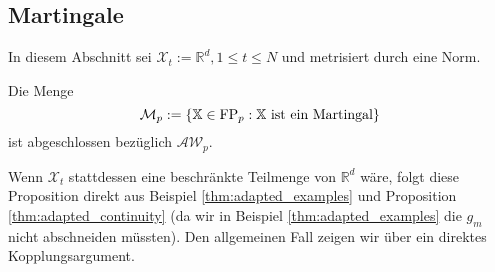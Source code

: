 \subsection{Martingale}
In diesem Abschnitt sei $\mathcal{X}_t := \mathbb{R}^d, 1\leq t \leq N$ und metrisiert durch eine Norm.
\begin{proposition}
    Die Menge 
    $$\mathcal{M}_p := \{\mathbb{X} \in \operatorname{FP}_p: \mathbb{X} \text{ ist ein Martingal} \}$$
    ist abgeschlossen bezüglich $\mathcal{AW}_p$.
\end{proposition}
Wenn $\mathcal{X}_t$ stattdessen eine beschränkte Teilmenge von $\mathbb{R}^d$ wäre, folgt diese Proposition direkt aus Beispiel \ref{thm:adapted_examples} und Proposition \ref{thm:adapted_continuity} (da wir in Beispiel \ref{thm:adapted_examples} die $g_m$ nicht abschneiden müssten). Den allgemeinen Fall zeigen wir über ein direktes Kopplungsargument.
